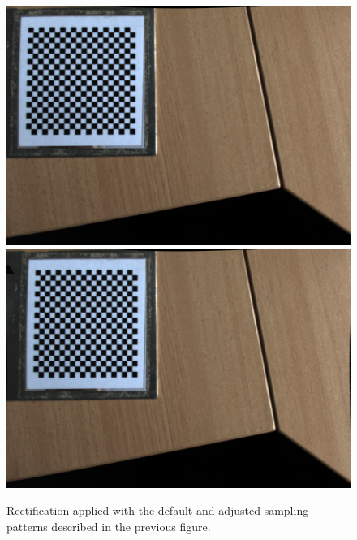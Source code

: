 \documentclass[onecolumn]{article}
\begin{document}
\begin{figure}[tbhp]
	\centering
	\includegraphics[width=1\textwidth]{Figs/IllumRectDefault}
	\includegraphics[width=1\textwidth]{Figs/IllumRectNonsquarePix}
	\caption{Rectification applied with the default and adjusted sampling patterns described in the previous figure.}
	\label{fig_AdjustRectIntrinsicResults}
\end{figure}
\end{document}
